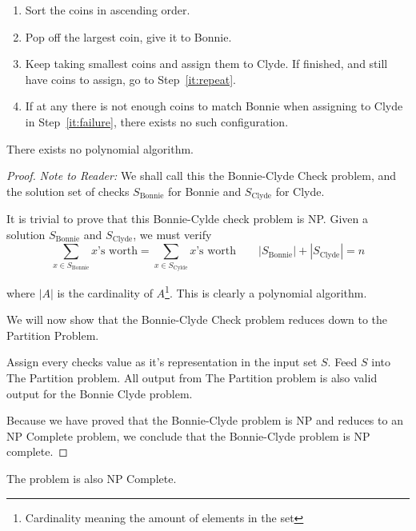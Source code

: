 \documentclass[12pt,listof=totoc,toc=sectionentrywithdots]{scrartcl}
\begin{document}
\begin{enumerate}
    \item Sort the coins in ascending order.
    \item\label{it:repeat} Pop off the largest coin, give it to Bonnie.
    \item\label{it:failure} Keep taking smallest coins and assign them to Clyde. If finished, and still have coins to assign, go to Step~\ref{it:repeat}.
    \item If at any there is not enough coins to match Bonnie when assigning to Clyde in Step~\ref{it:failure}, there exists no such configuration.
\end{enumerate}

% 

\subproblem{}
There exists no polynomial algorithm.

\begin{proof}
    \textit{Note to Reader:} We shall call this the Bonnie-Clyde Check problem, and the solution set of checks $S_\text{Bonnie}$ for Bonnie and $S_\text{Clyde}$ for Clyde.

    It is trivial to prove that this Bonnie-Cylde check problem is NP. Given a solution $S_\text{Bonnie}$ and $S_\text{Clyde}$, we must verify
    \begin{equation*}
        \sum_{x \in S_\text{Bonnie}} \text{$x$'s worth} = \sum_{x \in S_\text{Cylde}} \text{$x$'s worth} \qquad
        |S_\text{Bonnie}| + |S_\text{Clyde}| = n
    \end{equation*}

where $|A|$ is the cardinality of $A$\footnote{Cardinality meaning the amount of elements in the set}. This is clearly a polynomial algorithm.

    We will now show that the Bonnie-Clyde Check problem reduces down to the Partition Problem.

    Assign every checks value as it's representation in the input set $S$. Feed $S$ into The Partition problem. All output from The Partition problem is also valid output for the Bonnie Clyde problem.

    Because we have proved that the Bonnie-Clyde problem is NP and reduces to an NP Complete problem, we conclude that the Bonnie-Clyde problem is NP complete.
\end{proof}

\subproblem{}
The problem is also NP Complete.
\end{document}
